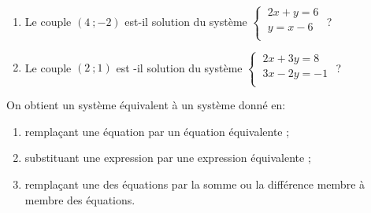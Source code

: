 \documentclass[a4paper,11pt,cours]{nsi}
\begin{document}
\begin{exercice}[ ]
	\begin{enumerate}
		\item 	Le couple $(4\ ;-2)$ est-il solution du système $\left\{
		\begin{array}{l}
			\ 2x+y=6 \\
			\ y=x-6 \\
		\end{array} \right.$ ?
		\item 	Le couple $(2\ ;1)$ est -il solution du système $\left\{
		\begin{array}{l}
			\ 2x+3y=8 \\
			\ 3x-2y=-1 \\
		\end{array} \right.$ ?
	\end{enumerate}
\end{exercice}

\begin{propriete}[ ]
	On obtient un système équivalent à un système donné en:
	\begin{enumerate}[label=\textbullet]
		\item 	remplaçant une équation par un équation équivalente ;
		\item 	substituant une expression par une expression équivalente ;
		\item	remplaçant une des équations par la somme ou la différence membre à membre des équations.	
	\end{enumerate}
\end{propriete}
\end{document}
